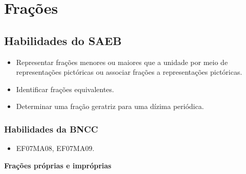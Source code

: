 

\chapter{Frações}

\section{Habilidades do SAEB }
\begin{itemize}
\item Representar frações menores ou maiores que a
unidade por meio de representações pictóricas ou associar frações a
representações pictóricas.
\item
  Identificar frações equivalentes.
\item
  Determinar uma fração geratriz para uma dízima periódica.
\end{itemize}

\subsection{Habilidades da BNCC }
\begin{itemize}
\item EF07MA08, EF07MA09.
\end{itemize}


\textbf{Frações próprias e impróprias}

